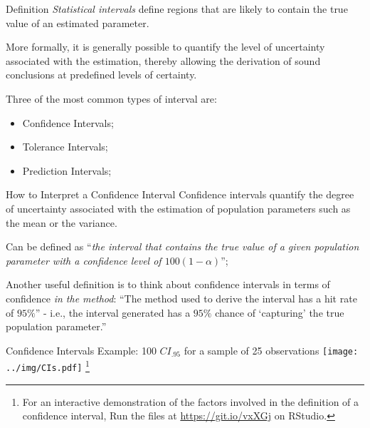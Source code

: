 
\begin{frame}{Definition}
\textit{Statistical intervals} define regions that are likely to contain the true value of an estimated parameter.
\bigskip

More formally, it is generally possible to quantify the level of uncertainty associated with the estimation, thereby allowing the derivation of sound conclusions at predefined levels of certainty.
\bigskip

Three of the most common types of interval are:

\begin{itemize}
  \item Confidence Intervals;
  \item Tolerance Intervals;
  \item Prediction Intervals;
\end{itemize}
\end{frame}



\begin{frame}{How to Interpret a Confidence Interval}
Confidence intervals quantify the degree of uncertainty associated with the estimation of population parameters such as the mean or the variance.\bigskip

Can be defined as ``\textit{the interval that contains the true value of a given population parameter with a confidence level of $100(1-\alpha)$}'';\bigskip

Another useful definition is to think about confidence intervals in terms of confidence \textit{in the method}: ``The method used to derive the interval has a hit rate of $95\%$'' - i.e., the interval generated has a $95\%$ chance of `capturing' the true population parameter.''
\end{frame}


\begin{frame}
{Confidence Intervals}
{Example: 100 $CI_{.95}$ for a sample of 25 observations}
\centering\texttt{[image: ../img/CIs.pdf]}
\footnote{For an interactive demonstration of the factors involved in the definition of a confidence interval, Run the files at \url{https://git.io/vxXGj} on RStudio.}
\end{frame}



